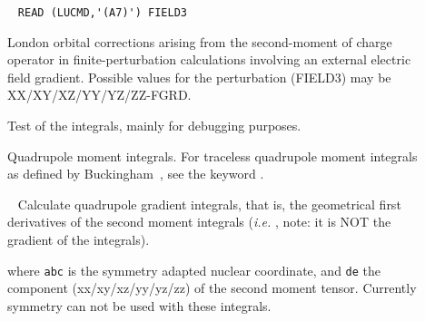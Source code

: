 \begin{description}
\item[]\verb| |\newline
\verb|READ (LUCMD,'(A7)') FIELD3|

London orbital corrections arising from the second-moment of charge
operator in finite-perturbation calculations involving an external
electric field gradient. Possible values for the perturbation (FIELD3)
may be XX/XY/XZ/YY/YZ/ZZ-FGRD.


\item[] Test of the  integrals, mainly for
  debugging purposes.

\item[] Quadrupole moment integrals.
For traceless quadrupole moment integrals as
defined by Buckingham~\cite{adbacp12}, see the keyword .


\item[]\verb| |\newline
Calculate quadrupole gradient integrals, that is, the geometrical first
derivatives of the second moment integrals
({\it i.e.\/} , note: it is NOT the gradient of the  integrals).

where \verb|abc| is the symmetry adapted nuclear coordinate, and \verb|de| the
component (xx/xy/xz/yy/yz/zz) of the second moment tensor. Currently
symmetry can not be used with these integrals.


\end{description}
